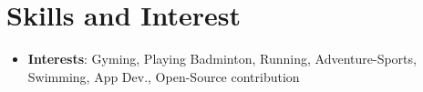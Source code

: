 \documentclass[letterpaper,11pt]{article}
\newcommand{\resumeSubHeadingListStart}{\begin{itemize}[leftmargin=*]}
\newcommand{\resumeSubHeadingListEnd}{\end{itemize}}
\newcommand{\resumeItem}[2]{
  \item\small{
    \textbf{#1}{: #2 \vspace{-2pt}}
  }
}
\newcommand{\resumeSubItem}[2]{
    \resumeItem{#1}{#2}\vspace{-4pt}
}
\begin{document}
\section{Skills and Interest}
  \resumeSubHeadingListStart
      \resumeSubItem{Interests}
      {Gyming, Playing Badminton, Running, Adventure-Sports, Swimming, App Dev., Open-Source contribution }
  \resumeSubHeadingListEnd
%


\end{document}
